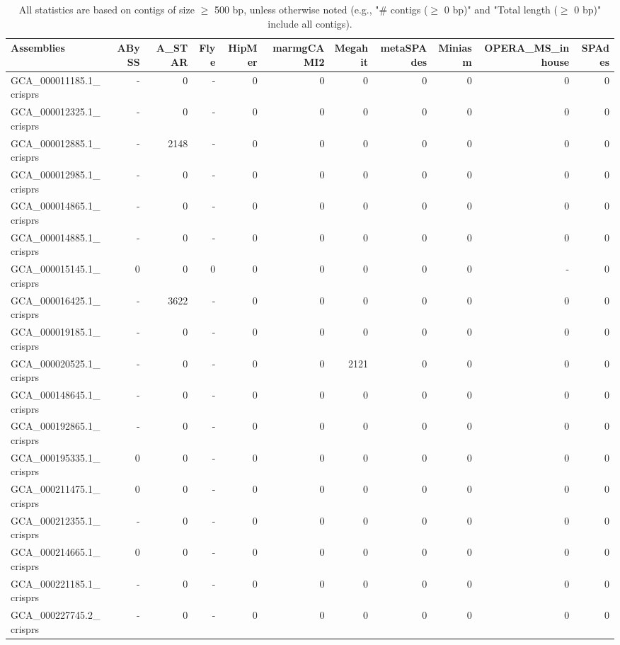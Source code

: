\documentclass[12pt,a4paper]{article}
\begin{document}
\begin{table}[ht]
\begin{center}
\caption{All statistics are based on contigs of size $\geq$ 500 bp, unless otherwise noted (e.g., "\# contigs ($\geq$ 0 bp)" and "Total length ($\geq$ 0 bp)" include all contigs).}
\begin{tabular}{|l*{10}{|r}|}
\hline
Assemblies & ABySS & A\_STAR & Flye & HipMer & marmgCAMI2 & Megahit & metaSPAdes & Miniasm & OPERA\_MS\_inhouse & SPAdes \\ \hline
GCA\_000011185.1\_crisprs & - & 0 & - & 0 & 0 & 0 & 0 & 0 & 0 & 0 \\ \hline
GCA\_000012325.1\_crisprs & - & 0 & - & 0 & 0 & 0 & 0 & 0 & 0 & 0 \\ \hline
GCA\_000012885.1\_crisprs & - & 2148 & - & 0 & 0 & 0 & 0 & 0 & 0 & 0 \\ \hline
GCA\_000012985.1\_crisprs & - & 0 & - & 0 & 0 & 0 & 0 & 0 & 0 & 0 \\ \hline
GCA\_000014865.1\_crisprs & - & 0 & - & 0 & 0 & 0 & 0 & 0 & 0 & 0 \\ \hline
GCA\_000014885.1\_crisprs & - & 0 & - & 0 & 0 & 0 & 0 & 0 & 0 & 0 \\ \hline
GCA\_000015145.1\_crisprs & 0 & 0 & 0 & 0 & 0 & 0 & 0 & 0 & - & 0 \\ \hline
GCA\_000016425.1\_crisprs & - & 3622 & - & 0 & 0 & 0 & 0 & 0 & 0 & 0 \\ \hline
GCA\_000019185.1\_crisprs & - & 0 & - & 0 & 0 & 0 & 0 & 0 & 0 & 0 \\ \hline
GCA\_000020525.1\_crisprs & - & 0 & - & 0 & 0 & 2121 & 0 & 0 & 0 & 0 \\ \hline
GCA\_000148645.1\_crisprs & - & 0 & - & 0 & 0 & 0 & 0 & 0 & 0 & 0 \\ \hline
GCA\_000192865.1\_crisprs & - & 0 & - & 0 & 0 & 0 & 0 & 0 & 0 & 0 \\ \hline
GCA\_000195335.1\_crisprs & 0 & 0 & - & 0 & 0 & 0 & 0 & 0 & 0 & 0 \\ \hline
GCA\_000211475.1\_crisprs & 0 & 0 & - & 0 & 0 & 0 & 0 & 0 & 0 & 0 \\ \hline
GCA\_000212355.1\_crisprs & - & 0 & - & 0 & 0 & 0 & 0 & 0 & 0 & 0 \\ \hline
GCA\_000214665.1\_crisprs & 0 & 0 & - & 0 & 0 & 0 & 0 & 0 & 0 & 0 \\ \hline
GCA\_000221185.1\_crisprs & - & 0 & - & 0 & 0 & 0 & 0 & 0 & 0 & 0 \\ \hline
GCA\_000227745.2\_crisprs & - & 0 & - & 0 & 0 & 0 & 0 & 0 & 0 & 0 \\ \hline

\end{tabular}
\end{center}
\end{table}
\end{document}
